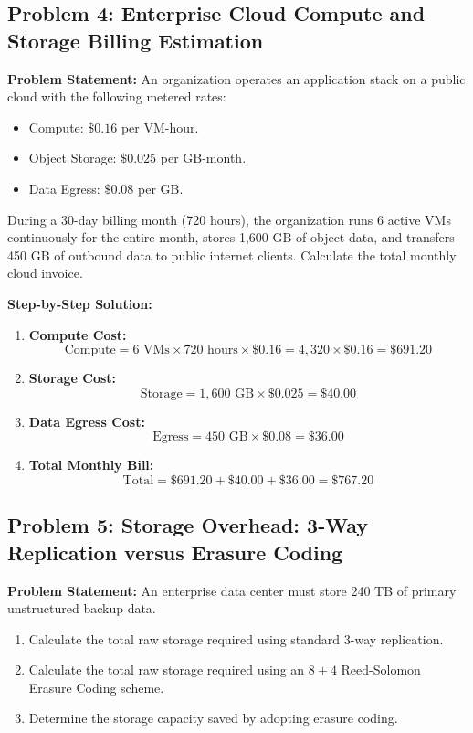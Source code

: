 \subsection*{Problem 4: Enterprise Cloud Compute and Storage Billing Estimation}
\textbf{Problem Statement:} An organization operates an application stack on a public cloud with the following metered rates:
\begin{itemize}
    \item Compute: $\$0.16$ per VM-hour.
    \item Object Storage: $\$0.025$ per GB-month.
    \item Data Egress: $\$0.08$ per GB.
\end{itemize}
During a 30-day billing month (720 hours), the organization runs 6 active VMs continuously for the entire month, stores 1,600 GB of object data, and transfers 450 GB of outbound data to public internet clients. Calculate the total monthly cloud invoice.

\textbf{Step-by-Step Solution:}
\begin{enumerate}[label=\arabic*.]
    \item \textbf{Compute Cost:}
    \[
    \text{Compute} = 6\text{ VMs} \times 720\text{ hours} \times \$0.16 = 4,320 \times \$0.16 = \mathbf{\$691.20}
    \]
    \item \textbf{Storage Cost:}
    \[
    \text{Storage} = 1,600\text{ GB} \times \$0.025 = \mathbf{\$40.00}
    \]
    \item \textbf{Data Egress Cost:}
    \[
    \text{Egress} = 450\text{ GB} \times \$0.08 = \mathbf{\$36.00}
    \]
    \item \textbf{Total Monthly Bill:}
    \[
    \text{Total} = \$691.20 + \$40.00 + \$36.00 = \mathbf{\$767.20}
    \]
\end{enumerate}

\subsection*{Problem 5: Storage Overhead: 3-Way Replication versus Erasure Coding}
\textbf{Problem Statement:} An enterprise data center must store 240 TB of primary unstructured backup data.
\begin{enumerate}[label=(\alph*)]
    \item Calculate the total raw storage required using standard 3-way replication.
    \item Calculate the total raw storage required using an $8+4$ Reed-Solomon Erasure Coding scheme.
    \item Determine the storage capacity saved by adopting erasure coding.
\end{enumerate}

